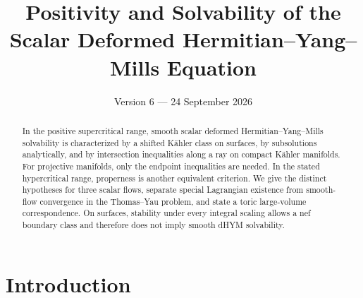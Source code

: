 \documentclass[12pt,reqno]{amsart}
\title[Positivity and solvability of the dHYM equation]{Positivity and Solvability of the\\Scalar Deformed Hermitian--Yang--Mills Equation}
\date{Version 6 --- 24 September 2026}
\numberwithin{equation}{section}
\theoremstyle{plain}
\theoremstyle{definition}
\begin{document}
\begin{abstract}
In the positive supercritical range, smooth scalar deformed
Hermitian--Yang--Mills solvability is characterized by a shifted
K\"ahler class on surfaces, by subsolutions analytically, and by
intersection inequalities along a ray on compact K\"ahler manifolds.
For projective manifolds, only the endpoint inequalities are needed.
In the stated hypercritical range, properness is another equivalent
criterion. We give the distinct hypotheses for three scalar flows,
separate special Lagrangian existence from smooth-flow convergence in
the Thomas--Yau problem, and state a toric large-volume correspondence.
On surfaces, stability under every integral scaling allows a nef
boundary class and therefore does not imply smooth dHYM solvability.
\end{abstract}
\maketitle
\tableofcontents

\section{Introduction}\label{background-forms-and-existence}
\end{document}
